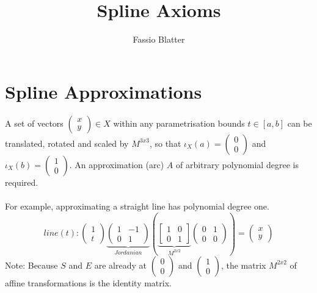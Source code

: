 \documentclass[a4paper,portrait]{report}
\begin{document}
\title{Spline Axioms}
\author{Fassio Blatter}
\maketitle

\chapter{Spline Approximations}
A set of vectors $\begin{pmatrix}x \\ y\end{pmatrix} \in X$ within any parametrisation bounds $t\in[a,b]$ can be translated, rotated and scaled by $M^{3x3}$, so that $\iota_{X}(a)=\begin{pmatrix}0 \\ 0\end{pmatrix}$ and $\iota_{X}(b)=\begin{pmatrix}1 \\ 0\end{pmatrix}$. An approximation (arc) $A$ of arbitrary polynomial degree is required.\\\\
For example, approximating a straight line has polynomial degree one.
\begin{equation}
line(t):
\begin{pmatrix}
1 \\
t
\end{pmatrix}
\underbrace{\begin{pmatrix}
1 & -1\\
0 & 1
\end{pmatrix}}_{Jordanian}
(\underbrace{\begin{bmatrix}
1 & 0\\
0 & 1
\end{bmatrix}}_{M^{2x2}}
\begin{pmatrix}
0 & 1\\
0 & 0
\end{pmatrix})
=
\begin{pmatrix}
x \\
y
\end{pmatrix}
\end{equation}
Note: Because $S$ and $E$ are already at $\begin{pmatrix}0\\0\end{pmatrix}$ and $\begin{pmatrix}1\\0\end{pmatrix}$, the matrix $M^{2x2}$ of affine transformations is the identity matrix.\\\\
\end{document}
